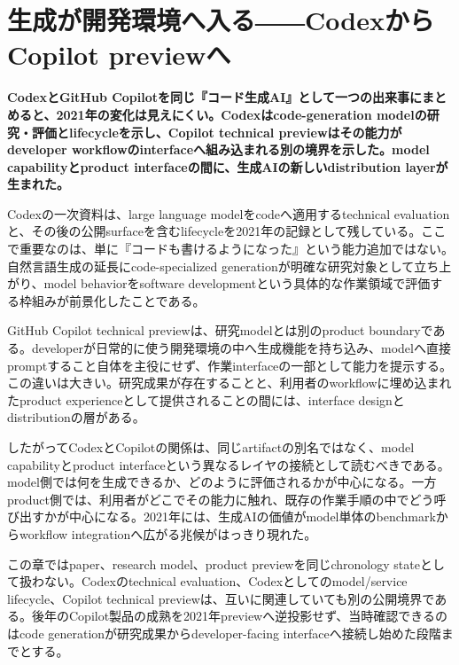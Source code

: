 \section{生成が開発環境へ入る――CodexからCopilot previewへ}
\noindent\textbf{CodexとGitHub Copilotを同じ『コード生成AI』として一つの出来事にまとめると、2021年の変化は見えにくい。Codexはcode-generation modelの研究・評価とlifecycleを示し、Copilot technical previewはその能力がdeveloper workflowのinterfaceへ組み込まれる別の境界を示した。model capabilityとproduct interfaceの間に、生成AIの新しいdistribution layerが生まれた。}\autocite{src-089fe2c6fbb1,src-47d0c87b08f0,src-5a992319f41e,src-890a73c0b288}

Codexの一次資料は、large language modelをcodeへ適用するtechnical evaluationと、その後の公開surfaceを含むlifecycleを2021年の記録として残している。ここで重要なのは、単に『コードも書けるようになった』という能力追加ではない。自然言語生成の延長にcode-specialized generationが明確な研究対象として立ち上がり、model behaviorをsoftware developmentという具体的な作業領域で評価する枠組みが前景化したことである。\autocite{src-47d0c87b08f0,src-5a992319f41e,src-890a73c0b288}


GitHub Copilot technical previewは、研究modelとは別のproduct boundaryである。developerが日常的に使う開発環境の中へ生成機能を持ち込み、modelへ直接promptすること自体を主役にせず、作業interfaceの一部として能力を提示する。この違いは大きい。研究成果が存在することと、利用者のworkflowに埋め込まれたproduct experienceとして提供されることの間には、interface designとdistributionの層がある。\autocite{src-089fe2c6fbb1}


したがってCodexとCopilotの関係は、同じartifactの別名ではなく、model capabilityとproduct interfaceという異なるレイヤの接続として読むべきである。model側では何を生成できるか、どのように評価されるかが中心になる。一方product側では、利用者がどこでその能力に触れ、既存の作業手順の中でどう呼び出すかが中心になる。2021年には、生成AIの価値がmodel単体のbenchmarkからworkflow integrationへ広がる兆候がはっきり現れた。\autocite{src-089fe2c6fbb1,src-47d0c87b08f0,src-5a992319f41e,src-890a73c0b288}


この章ではpaper、research model、product previewを同じchronology stateとして扱わない。Codexのtechnical evaluation、Codexとしてのmodel/service lifecycle、Copilot technical previewは、互いに関連していても別の公開境界である。後年のCopilot製品の成熟を2021年previewへ逆投影せず、当時確認できるのはcode generationが研究成果からdeveloper-facing interfaceへ接続し始めた段階までとする。\autocite{src-089fe2c6fbb1,src-47d0c87b08f0,src-5a992319f41e,src-890a73c0b288}


